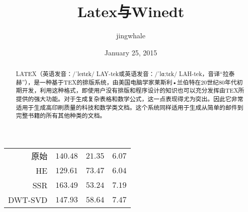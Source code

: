 \documentclass[UTF8]{ctexart}
\begin{document}
\title{Latex与Winedt}
\author{jingwhale}
\date{January 25, 2015}
\maketitle

\begin{abstract}
LATEX（英语发音：/ˈleɪtɛk/ LAY-tek或英语发音：/ˈlɑːtɛk/ LAH-tek，音译“拉泰赫”），是一种基于TEX的排版系统，由美国电脑学家莱斯利•兰伯特在20世纪80年代初期开发，利用这种格式，即使用户没有排版和程序设计的知识也可以充分发挥由TEX所提供的强大功能。对于生成复杂表格和数学公式，这一点表现得尤为突出。因此它非常适用于生成高印刷质量的科技和数学类文档。这个系统同样适用于生成从简单的邮件到完整书籍的所有其他种类的文档。
\end{abstract}

\begin{table}[!htbp]

    \begin{tabular}{|r|r|r|r|}
		\hline
        原始     & $140.48$ & $21.35$ & $6.07$ \\
        HE            & $129.61$ & $73.47$ & $6.04$ \\
        SSR           & $163.49$ & $53.24$ & $7.19$ \\
        DWT-SVD       & $147.93$ & $58.64$ & $7.47$ \\
        \hline
    \end{tabular}
\end{table}
\end{document}

